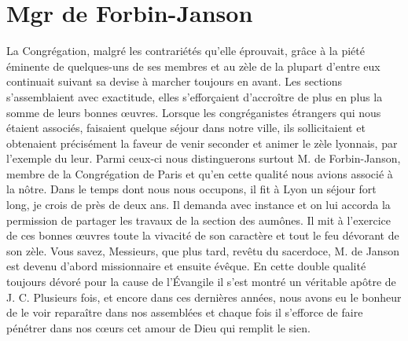 \section*{Mgr de Forbin-Janson}
La Congrégation, malgré les contrariétés qu'elle éprouvait, grâce à la piété éminente de quelques-uns de ses membres et au
zèle de la plupart d'entre eux continuait suivant sa devise à marcher toujours en avant. Les sections s'assemblaient avec exactitude, elles s'efforçaient d'accroître de plus en plus la somme de leurs bonnes œuvres. Lorsque les congréganistes étrangers qui nous étaient associés, faisaient quelque séjour dans notre ville, ils sollicitaient et obtenaient précisément la faveur de venir seconder et animer le zèle lyonnais, par l'exemple du leur. Parmi ceux-ci nous distinguerons surtout M. de Forbin-Janson, membre de la Congrégation de Paris et qu'en cette qualité nous avions associé à la nôtre. Dans le temps dont nous nous occupons, il fit à Lyon un séjour fort long, je crois de près de deux ans. Il demanda avec instance et on lui accorda la permission de partager les travaux de la section des aumônes. Il mit à l'exercice de ces bonnes œuvres toute la vivacité de son caractère et tout le feu dévorant de son zèle. Vous savez, Messieurs, que plus tard, revêtu du sacerdoce, M. de Janson est devenu d'abord missionnaire et ensuite évêque. En cette double qualité toujours dévoré pour la cause de l'Évangile il s'est montré un véritable apôtre de J. C. Plusieurs fois, et encore dans ces dernières années, nous avons eu le bonheur de le voir reparaître dans nos assemblées et chaque fois il s'efforce de faire pénétrer dans nos cœurs cet amour de Dieu qui remplit le sien.

